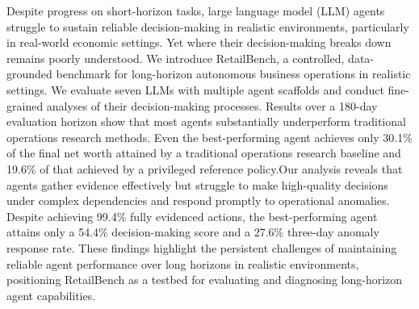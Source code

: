 Despite progress on short-horizon tasks, large language model (LLM) agents struggle to sustain reliable decision-making in realistic environments, particularly in real-world economic settings. Yet where their decision-making breaks down remains poorly understood. We introduce RetailBench, a controlled, data-grounded benchmark for long-horizon autonomous business operations in realistic settings. We evaluate seven LLMs with multiple agent scaffolds and conduct fine-grained analyses of their decision-making processes. Results over a 180-day evaluation horizon show that most agents substantially underperform traditional operations research methods. 
 Even the best-performing agent achieves only 30.1\% of the final net worth attained by a traditional operations research baseline and 19.6\% of that achieved by a privileged reference policy.Our analysis reveals that agents gather evidence effectively but struggle to make high-quality decisions under complex dependencies and respond promptly to operational anomalies. Despite achieving 99.4\% fully evidenced actions, the best-performing agent attains only a 54.4\% decision-making score and a 27.6\% three-day anomaly response rate.
These findings highlight the persistent challenges of maintaining reliable agent performance over long horizons in realistic environments, positioning RetailBench as a testbed for evaluating and diagnosing long-horizon agent capabilities.